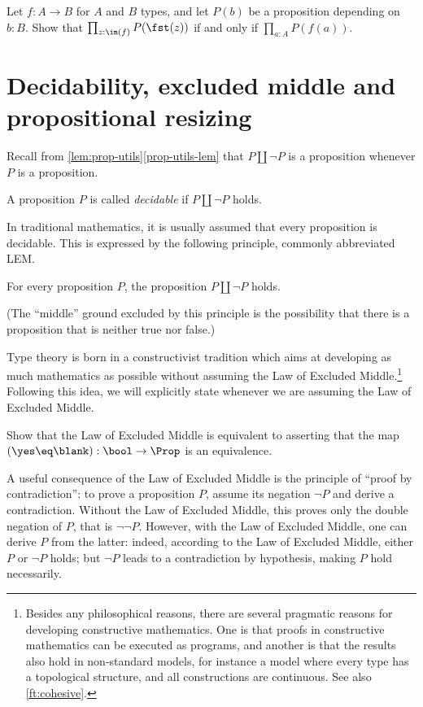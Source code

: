 \begin{xca}\label{xca:all-prop-image}
Let $f:A\to B$ for $A$ and $B$ types, and let $P(b)$ be a proposition
depending on $b:B$.
Show that $\prod_{z:\im(f)} P(\fst(z))$ if and only if $\prod_{a:A} P(f(a))$.
\end{xca}



\section{Decidability, excluded middle and propositional resizing}
\label{sec:decidability}

Recall from \cref{lem:prop-utils}\ref{prop-utils-lem} that $P\amalg \neg P$ is a proposition whenever $P$ is a proposition.
\begin{definition}\label{def:decidability}
  A proposition $P$ is called \emph{decidable}
  if $P\amalg\neg P$ holds.
\end{definition}
In traditional mathematics, it is usually assumed that
every proposition is decidable.
This is expressed by the following principle, commonly abbreviated LEM.
\begin{principle}
  \label{pri:lem}%
  For every proposition $P$, the proposition $P \amalg \neg P$ holds.
\end{principle}

(The ``middle'' ground excluded by this principle is the possibility that there
is a proposition that is neither true nor false.)

Type theory is born
in a constructivist tradition
which aims at developing as much mathematics as
possible without assuming the Law of Excluded Middle.\footnote{%
  Besides any philosophical reasons,
  there are several pragmatic reasons
  for developing constructive mathematics.
  One is that proofs in constructive mathematics
  can be executed as programs,
  and another is that the results also hold in non-standard models,
  for instance a model where every type has a topological structure,
  and all constructions are continuous.
  See also \cref{ft:cohesive}.}
Following this idea, we will
explicitly state whenever we are assuming the Law of Excluded Middle.
\begin{xca}\label{xca:lem-prop}
  Show that the Law of Excluded Middle is equivalent to asserting
  that the map $(\yes \eq \blank) : \bool \to \Prop$
  is an equivalence.
\end{xca}
A useful consequence of the Law of Excluded Middle is the principle of
``proof by contradiction'': to prove a proposition $P$,
assume its negation $\neg P$ and derive a contradiction.
Without the Law of Excluded Middle, this proves only the double negation of
$P$, that is $\neg \neg P$.  However, with the Law of Excluded Middle,
one can derive $P$ from the latter: indeed, according to the
Law of Excluded Middle, either $P$ or $\neg P$ holds;
but $\neg P$ leads to a contradiction by hypothesis, making $P$ hold
necessarily.

